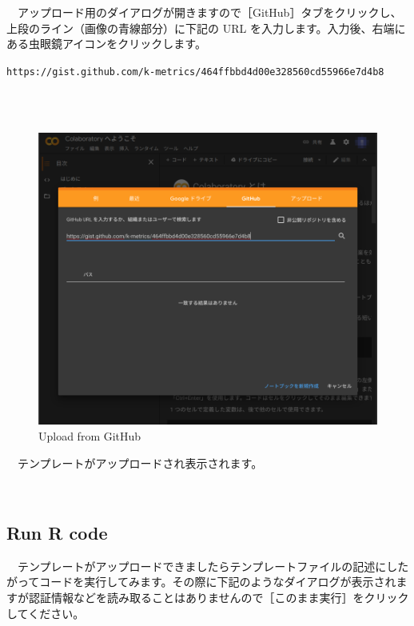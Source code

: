 \documentclass[
  12pt,
]{book}
\begin{document}
　アップロード用のダイアログが開きますので［GitHub］タブをクリックし、上段のライン（画像の青線部分）に下記の URL を入力します。入力後、右端にある虫眼鏡アイコンをクリックします。

\texttt{https://gist.github.com/k-metrics/464ffbbd4d00e328560cd55966e7d4b8}\strut \\
　

\begin{figure}[H]

{\centering \includegraphics[width=0.8\linewidth,]{fig/Colab/upload_dialog} 

}

\caption{Upload from GitHub}\label{fig:unnamed-chunk-126}
\end{figure}

　テンプレートがアップロードされ表示されます。

　

\hypertarget{run-r-code}{%
\subsection{Run R code}\label{run-r-code}}

　テンプレートがアップロードできましたらテンプレートファイルの記述にしたがってコードを実行してみます。その際に下記のようなダイアログが表示されますが認証情報などを読み取ることはありませんので［このまま実行］をクリックしてください。
\end{document}
